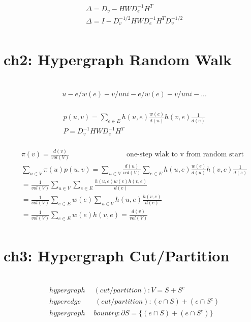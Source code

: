 \documentclass{article}
\begin{document}
%
\begin{align*}
    & \Delta = D_{v} - H W D_{e}^{-1} H^{T} \\[3pt]
    & \Delta = I - D_{v}^{-1/2} H W D_{e}^{-1} H^{T} D_{v}^{-1/2} \\[3pt]
\end{align*}


\newpage
\section*{ch2: Hypergraph Random Walk}


~ \\[3pt]
%
\begin{align*}
    & u-e/w(e)-v/uni-e/w(e)-v/uni-...  \\[3pt]
\end{align*}


%
\begin{align*}
    & p(u, v) = \sum_{e \in E} 
                h(u, e) \frac{w(e)}{d(u)} 
                h(v, e) \frac{1}{d(e)}  \\[3pt]
    & P = D_{v}^{-1} H W D_{e}^{-1} H^{T}  \\[3pt]
\end{align*}


%
\begin{align*}
    & \pi (v) = \frac{d(v)}{vol(V)} \qquad \qquad \qquad \qquad 
      \text{one-step wlak to v from random start}  \\[3pt]
    & \sum_{u \in V} \pi (u) p(u, v) = 
      \sum_{u \in V} \frac{d(u)}{vol(V)} 
      \sum_{e \in E} h(u, e) \frac{w(e)}{d(u)} h(v, e) \frac{1}{d(e)} \\[3pt]
    & = \frac{1}{vol(V)} \sum_{u \in V} \sum_{e \in E} 
        \frac{h(u, e)w(e)h(v, e)}{d(e)} \\[3pt]
    & = \frac{1}{vol(V)} \sum_{e \in E} w(e) 
        \sum_{u \in V} h(u, e) \frac{h(v, e)}{d(e)} \\[3pt]
    & = \frac{1}{vol(V)} \sum_{e \in E} w(e) h(v, e) = \frac{d(v)}{vol(V)}  \\[3pt]
\end{align*}


\newpage
\section*{ch3: Hypergraph Cut/Partition}


~ \\[3pt]
%
\begin{align*}
    & hypergraph \quad \ (cut/partition): V = S + S^{c}  \\[3pt]
    & hyperedge \qquad (cut/partition): (e \cap S) + (e \cap S^{c})  \\[3pt]
    & hypergraph \quad \ bountry: \partial S = \{ (e \cap S) + (e \cap S^{c}) \}  \\[3pt]
\end{align*}
\end{document}
